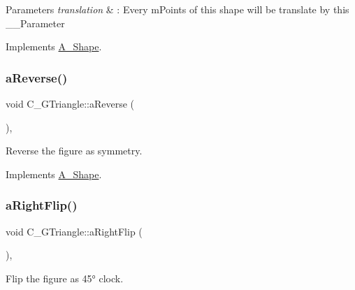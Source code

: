 \begin{DoxyParams}{Parameters}
{\em translation} & \+: Every m\+Points of this shape will be translate by this \+\_\+\+\_\+\+Parameter \\
\hline
\end{DoxyParams}


Implements \hyperlink{classA__Shape_ab284298db1b557ccfa7ba6de7a5fee2c}{A\+\_\+\+Shape}.

\mbox{\label{classC__GTriangle_a479646fa1265aaf2299b59787c394a27}} 
\subsubsection{\texorpdfstring{a\+Reverse()}{aReverse()}}
{\footnotesize\ttfamily void C\+\_\+\+G\+Triangle\+::a\+Reverse (\begin{DoxyParamCaption}{ }\end{DoxyParamCaption})\hspace{0.3cm}{\ttfamily [override]}, {\ttfamily [virtual]}}



Reverse the figure as symmetry. 



Implements \hyperlink{classA__Shape_afe2c7969d647f6358da13879a7534ecb}{A\+\_\+\+Shape}.

\mbox{\label{classC__GTriangle_aa4f808a02ae18bd36c205a5d70eb3fef}} 
\subsubsection{\texorpdfstring{a\+Right\+Flip()}{aRightFlip()}}
{\footnotesize\ttfamily void C\+\_\+\+G\+Triangle\+::a\+Right\+Flip (\begin{DoxyParamCaption}{ }\end{DoxyParamCaption})\hspace{0.3cm}{\ttfamily [override]}, {\ttfamily [virtual]}}



Flip the figure as 45° clock. 



